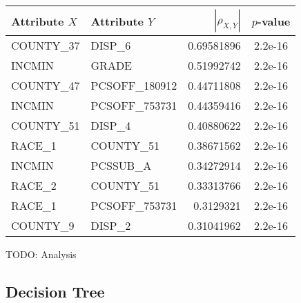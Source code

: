 \documentclass[]{article}
\begin{document}
\begin{tabular}{|l|l|r|c|}
\hline
Attribute $X$ & Attribute $Y$ & $|\rho_{X,Y}|$ & $p$-value \\
\hline
COUNTY\_37&	DISP\_6&	0.69581896 & 2.2e-16\\
INCMIN&	GRADE&	0.51992742 & 2.2e-16\\
COUNTY\_47&	PCSOFF\_180912&	0.44711808 & 2.2e-16\\
INCMIN&	PCSOFF\_753731&	0.44359416 & 2.2e-16\\
COUNTY\_51&	DISP\_4&	0.40880622 & 2.2e-16\\
RACE\_1&	COUNTY\_51&	0.38671562 & 2.2e-16\\
INCMIN&	PCSSUB\_A&	0.34272914 & 2.2e-16\\
RACE\_2&	COUNTY\_51&	0.33313766 & 2.2e-16\\
RACE\_1&	PCSOFF\_753731&	0.3129321 & 2.2e-16\\
COUNTY\_9&	DISP\_2&	0.31041962 & 2.2e-16\\
\hline
\end{tabular}

TODO: Analysis

\subsection{Decision Tree}
\end{document}
